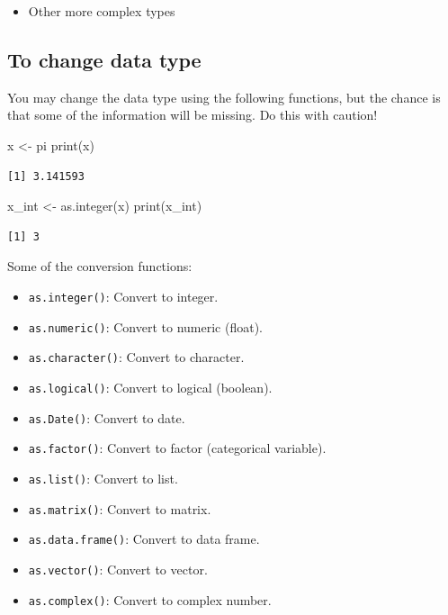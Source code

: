 \documentclass[
  letterpaper,
  DIV=11,
  numbers=noendperiod]{scrreprt}
\newenvironment{Shaded}{\begin{snugshade}}{\end{snugshade}}
\newcommand{\FunctionTok}[1]{\textcolor[rgb]{0.28,0.35,0.67}{#1}}
\newcommand{\NormalTok}[1]{\textcolor[rgb]{0.00,0.23,0.31}{#1}}
\newcommand{\OtherTok}[1]{\textcolor[rgb]{0.00,0.23,0.31}{#1}}
\providecommand{\tightlist}{%
  \setlength{\itemsep}{0pt}\setlength{\parskip}{0pt}}
\begin{document}
\begin{itemize}
\tightlist
\item
  Other more complex types
\end{itemize}

\subsection{To change data type}\label{to-change-data-type}

You may change the data type using the following functions, but the
chance is that some of the information will be missing. Do this with
caution!

\begin{Shaded}
\begin{Highlighting}[]
\NormalTok{x }\OtherTok{\textless{}{-}}\NormalTok{ pi}
\FunctionTok{print}\NormalTok{(x)}
\end{Highlighting}
\end{Shaded}

\begin{verbatim}
[1] 3.141593
\end{verbatim}

\begin{Shaded}
\begin{Highlighting}[]
\NormalTok{x\_int }\OtherTok{\textless{}{-}} \FunctionTok{as.integer}\NormalTok{(x)}
\FunctionTok{print}\NormalTok{(x\_int)}
\end{Highlighting}
\end{Shaded}

\begin{verbatim}
[1] 3
\end{verbatim}

Some of the conversion functions:

\begin{itemize}
\tightlist
\item
  \texttt{as.integer()}: Convert to integer.
\item
  \texttt{as.numeric()}: Convert to numeric (float).
\item
  \texttt{as.character()}: Convert to character.
\item
  \texttt{as.logical()}: Convert to logical (boolean).
\item
  \texttt{as.Date()}: Convert to date.
\item
  \texttt{as.factor()}: Convert to factor (categorical variable).
\item
  \texttt{as.list()}: Convert to list.
\item
  \texttt{as.matrix()}: Convert to matrix.
\item
  \texttt{as.data.frame()}: Convert to data frame.
\item
  \texttt{as.vector()}: Convert to vector.
\item
  \texttt{as.complex()}: Convert to complex number.
\end{itemize}
\end{document}
